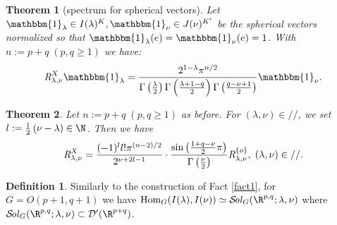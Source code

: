 \documentclass[portrait,final,paperwidth=90cm,paperheight=120cm,fontscale=0.3]{baposter}
\newtheorem{theorem}{Theorem}
\newcommand{\Hom}{\mbox{\normalfont Hom}}
\newcommand{\Sol}{\mathcal{S}\!{\it ol}}
\theoremstyle{definition}
\newtheorem{definition}{Definition}
\newcommand{\OpR}{\mbox{\it R}}
\begin{document}
\begin{poster}
{\begin{theorem}[spectrum for spherical vectors]
	Let $\mathbbm{1}_\lambda\in I(\lambda)^K,\mathbbm{1}_\nu\in J(\nu)^{K'}$ be the spherical vectors normalized so that $\mathbbm{1}_\lambda(e)=\mathbbm{1}_\nu(e)=1$.
	With $n:=p+q\;(p,q\ge1)$ we have:
\[ \OpR^X_{\lambda, \nu} \mathbbm{1}_{\lambda} =  \frac{2^{1 -
\lambda}\pi^{n / 2}}{\Gamma \left( \frac{\lambda}{2} \right)
\Gamma \left(  \frac{\lambda + 1-q}{2} \right) \Gamma \left(
\frac{q - \nu + 1}{2} \right)} \mathbbm{1}_{\nu}. \]
\end{theorem}
}
{
\begin{theorem}
	Let $n:=p+q\;(p,q\ge1)$ as before.
	For $(\lambda,\nu)\in//$, we set $l:=\frac{1}{2}\left( \nu-\lambda \right)\in\N$. Then we have
  \[\OpR_{\lambda,\nu}^X  = \frac{ (- 1)^l l!\pi^{(n - 2) / 2} 
		}{2^{ \nu + 2 l-1}}\cdot  \frac{\sin\left( \frac{1+q-\nu}{2}\pi \right)}{\Gamma\left( \frac{\nu}{2} \right)}
     \OpR_{\lambda,\nu}^{ \left\{ o \right\} },\;(\lambda,\nu)\in//. \]
	\end{theorem}
}
{
	\begin{definition}
		Similarly to the construction of Fact \ref{fact1}, for $G=O(p+1,q+1)$ we have $\Hom_G(I(\lambda),I(\nu))\simeq\Sol_G(\R^{p,q};\lambda,\nu)$
		where $\Sol_G(\R^{p,q};\lambda,\nu)\subset\mathcal{D}'(\R^{p+q})$.


\end{definition}}
\end{poster}
\end{document}
